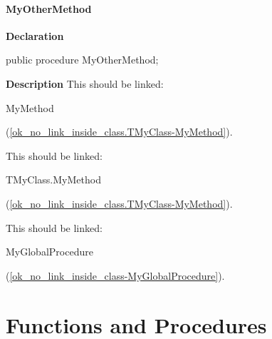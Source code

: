 \documentclass{report}
\begin{document}
\paragraph*{MyOtherMethod}\hspace*{\fill}

\begin{list}{}{
\setlength{\itemindent}{0cm}
\setlength{\listparindent}{0cm}
\setlength{\leftmargin}{\evensidemargin}
\addtolength{\leftmargin}{\tmplength}
\settowidth{\labelsep}{X}
\addtolength{\leftmargin}{\labelsep}
\setlength{\labelwidth}{\tmplength}
}
\begin{flushleft}
\item[\textbf{Declaration}\hfill]
\begin{ttfamily}
public procedure MyOtherMethod;\end{ttfamily}


\end{flushleft}
\par
\item[\textbf{Description}]
This should be linked: \begin{ttfamily}MyMethod\end{ttfamily}(\ref{ok_no_link_inside_class.TMyClass-MyMethod}).

This should be linked: \begin{ttfamily}TMyClass.MyMethod\end{ttfamily}(\ref{ok_no_link_inside_class.TMyClass-MyMethod}).

This should be linked: \begin{ttfamily}MyGlobalProcedure\end{ttfamily}(\ref{ok_no_link_inside_class-MyGlobalProcedure}).

\end{list}
\section{Functions and Procedures}
\end{document}
